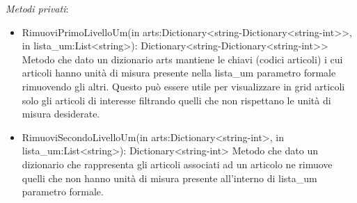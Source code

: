 \textit{Metodi privati}:\\
\begin{itemize}
    \item RimuoviPrimoLivelloUm(in arts:Dictionary<string-Dictionary<string-int>>, in lista\_um:List<string>): Dictionary<string-Dictionary<string-int>>
    Metodo che dato un dizionario arts mantiene le chiavi (codici articoli) i cui articoli hanno unità di misura presente nella lista\_um parametro formale rimuovendo gli altri.
    Questo può essere utile per visualizzare in grid articoli solo gli articoli di interesse filtrando quelli che non rispettano le unità di misura desiderate. 
    \item RimuoviSecondoLivelloUm(in arts:Dictionary<string-int>, in lista\_um:List<string>): Dictionary<string-int>
    Metodo che dato un dizionario che rappresenta gli articoli associati ad un articolo ne rimuove quelli che non hanno unità di misura presente all'interno di lista\_um
    parametro formale.
\end{itemize}  


